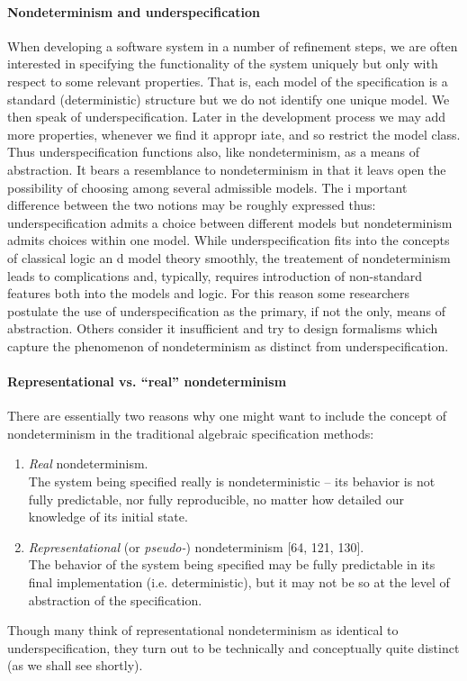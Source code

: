 \documentclass[10pt]{article}
\newcommand{\MyLPar}{\parsep -.2ex plus.2ex minus.2ex\itemsep\parsep 
\vspace{-\topsep}\vspace{.5ex}}
\newenvironment{enum}{\begin{enumerate}\MyLPar}{\end{enumerate}}
\begin{document}
\paragraph*{Nondeterminism and underspecification}
When developing a software system 
in a number of refinement steps, we are often interested in 
specifying the functionality of the system uniquely but only with 
respect to some relevant properties. 
That is, each model of the specification is a standard 
(deterministic) structure but we do not identify one unique model. We 
then speak of underspecification. Later in the development process we 
may add more properties, whenever we find it appropr
iate, and so restrict the model class. Thus underspecification 
functions also, like nondeterminism, as a means of abstraction. It 
bears a resemblance to nondeterminism in that it leavs open the 
possibility of choosing among several admissible models. The i
mportant difference between the two notions may be roughly expressed 
thus: underspecification admits a choice between different models but 
nondeterminism admits choices within one model. While 
underspecification fits into the concepts of classical logic an
d model theory smoothly, the treatement of nondeterminism leads to 
complications and, typically, requires introduction of non-standard 
features both into the models and logic. For this reason some 
researchers postulate the use of underspecification as the 
primary, if not the only, means of abstraction. Others consider it 
insufficient and try to design formalisms which capture the 
phenomenon of nondeterminism as distinct from underspecification.

\paragraph*{Representational vs. ``real''  nondeterminism}
There are essentially two reasons 
why one might want to include the concept of nondeter\-minism in the 
traditional algebraic specification methods:
\begin{enum}
\item {\em Real} nondeterminism.\\
The system being specified 
really is nondeterministic --  its behavior is not fully 
pre\-dict\-able, nor fully reproducible, no matter how detailed our 
knowledge of its initial state.
\item {\em Representational} (or {\em pseudo-}) nondeterminism [64, 121, 130].\\
The behavior of the system 
being specified may be fully predictable in its final 
imple\-mentation (i.e. deterministic), but it may not be so at the 
level of abstraction of the specification.
\end{enum}
Though many think of 
representational nondeterminism as identical to 
under\-specifi\-cation, they turn out to be technically and 
conceptually quite distinct (as we shall see shortly). 
\end{document}
